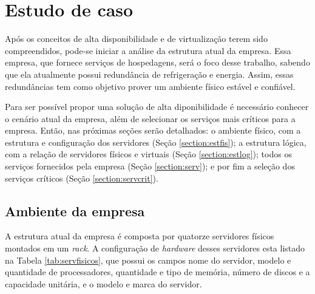 \chapter{Estudo de caso}
\label{cap:estudodecaso}

Após os conceitos de alta disponibilidade e de virtualização terem sido compreendidos, pode-se iniciar a análise da estrutura atual da empresa.
Essa empresa, que fornece serviços de hospedagens, será o foco desse trabalho, sabendo que ela atualmente possui redundância de refrigeração 
e energia. Assim, essas redundâncias tem como objetivo prover um ambiente físico estável e confiável.

Para ser possível propor uma solução de alta diponibilidade é necessário conhecer o cenário atual da empresa, além de selecionar os serviços
mais críticos para a empresa. Então, nas próximas seções serão detalhados: o ambiente físico, com a estrutura e configuração dos servidores 
(Seção \ref{section:estfis}); a estrutura lógica, com a relação de servidores físicos e virtuais (Seção \ref{section:estlog}); todos os 
serviços fornecidos pela empresa (Seção \ref{section:serv}); e por fim a seleção dos serviços críticos (Seção \ref{section:servcrit}).

\section{Ambiente da empresa}
\label{section:ambiente}

A estrutura atual da empresa é composta por quatorze servidores físicos montados em um \textit{rack}. A configuração de \textit{hardware} desses 
servidores esta listado na Tabela \ref{tab:servfisicos}, que possui os campos nome do servidor, modelo e quantidade de processadores, quantidade
e tipo de memória, número de discos e a capacidade unitária, e o modelo e marca do servidor.

